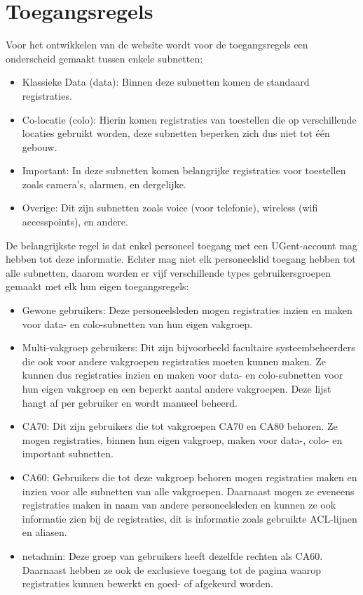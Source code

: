 \section{Toegangsregels}
\label{toegangsregels}
Voor het ontwikkelen van de website wordt voor de toegangsregels een onderscheid gemaakt tussen enkele subnetten: 
\begin{itemize}
    \item Klassieke Data (data): Binnen deze subnetten komen de standaard registraties.
    \item Co-locatie (colo): Hierin komen registraties van toestellen die op verschillende locaties gebruikt worden, deze subnetten beperken zich dus niet tot één gebouw.
    \item Important: In deze subnetten komen belangrijke registraties voor toestellen zoals camera's, alarmen, en dergelijke.
    \item Overige: Dit zijn subnetten zoals voice (voor telefonie), wireless (wifi accesspoints), en andere.
\end{itemize} 
De belangrijkste regel is dat enkel personeel toegang met een UGent-account mag hebben tot deze informatie.
Echter mag niet elk personeelslid toegang hebben tot alle subnetten, daarom worden er vijf verschillende types gebruikersgroepen gemaakt met elk hun eigen toegangsregels:
\begin{itemize}
    \item Gewone gebruikers: Deze personeelsleden mogen registraties inzien en maken voor data- en colo-subnetten van hun eigen vakgroep.
    \item Multi-vakgroep gebruikers: Dit zijn bijvoorbeeld facultaire systeembeheerders die ook voor andere vakgroepen registraties moeten kunnen maken. Ze kunnen dus registraties inzien en maken voor data- en colo-subnetten voor hun eigen vakgroep en een beperkt aantal andere vakgroepen. Deze lijst hangt af per gebruiker en wordt manueel beheerd.
    \item CA70: Dit zijn gebruikers die tot vakgroepen CA70 en CA80 behoren. Ze mogen registraties, binnen hun eigen vakgroep, maken voor data-, colo- en important subnetten.
    \item CA60: Gebruikers die tot deze vakgroep behoren mogen registraties maken en inzien voor alle subnetten van alle vakgroepen. Daarnaast mogen ze eveneens registraties maken in naam van andere personeelsleden en kunnen ze ook informatie zien bij de registraties, dit is informatie zoals gebruikte ACL-lijnen en aliasen.
    \item netadmin: Deze groep van gebruikers heeft dezelfde rechten als CA60. Daarnaast hebben ze ook de exclusieve toegang tot de pagina waarop registraties kunnen bewerkt en goed- of afgekeurd worden.
\end{itemize}

